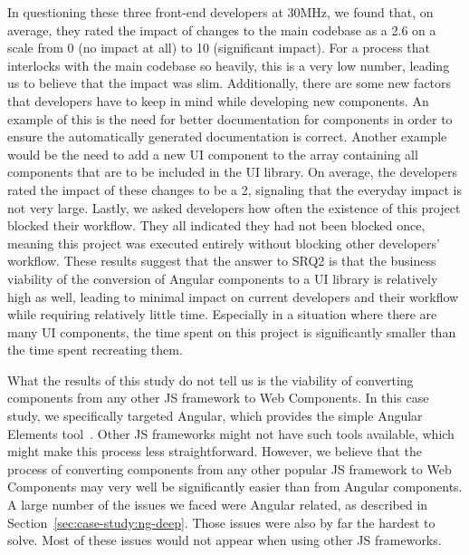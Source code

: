 In questioning these three front-end developers at 30MHz, we found that, on average, they rated the impact of changes to the main codebase as a 2.6 on a scale from 0 (no impact at all) to 10 (significant impact). For a process that interlocks with the main codebase so heavily, this is a very low number, leading us to believe that the impact was slim.
Additionally, there are some new factors that developers have to keep in mind while developing new components. An example of this is the need for better documentation for components in order to ensure the automatically generated documentation is correct. Another example would be the need to add a new UI component to the array containing all components that are to be included in the UI library. On average, the developers rated the impact of these changes to be a 2, signaling that the everyday impact is not very large. Lastly, we asked developers how often the existence of this project blocked their workflow. They all indicated they had not been blocked once, meaning this project was executed entirely without blocking other developers' workflow. These results suggest that the answer to SRQ2 is that the business viability of the conversion of Angular components to a UI library is relatively high as well, leading to minimal impact on current developers and their workflow while requiring relatively little time. Especially in a situation where there are many UI components, the time spent on this project is significantly smaller than the time spent recreating them.

What the results of this study do not tell us is the viability of converting components from any other JS framework to Web Components. In this case study, we specifically targeted Angular, which provides the simple Angular Elements tool~. Other JS frameworks might not have such tools available, which might make this process less straightforward. However, we believe that the process of converting components from any other popular JS framework to Web Components may very well be significantly easier than from Angular components. A large number of the issues we faced were Angular related, as described in Section~\ref{sec:case-study:ng-deep}. Those issues were also by far the hardest to solve. Most of these issues would not appear when using other JS frameworks.